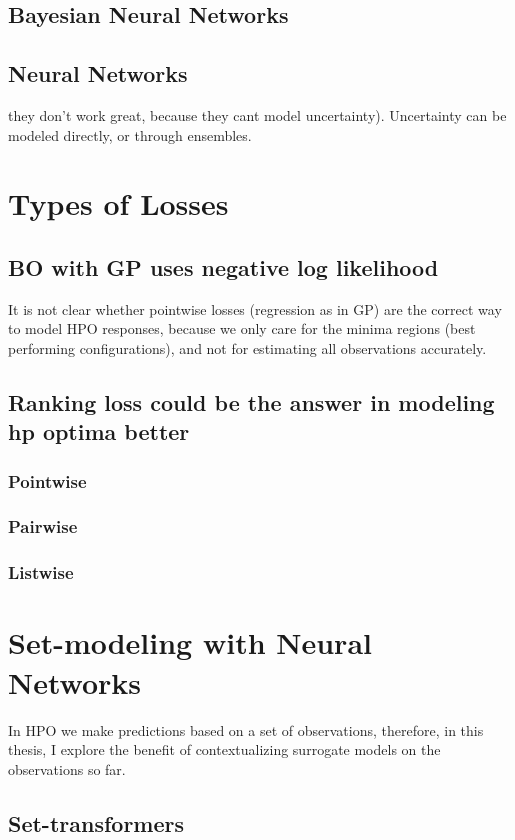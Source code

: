 \documentclass[11pt]{report}
\begin{document}
\subsection{Bayesian Neural Networks}
\subsection{Neural Networks}
they don't work great, because they cant model uncertainty). Uncertainty can be modeled directly, or through ensembles.

\section{Types of Losses}
\subsection{BO with GP uses negative log likelihood}
It is not clear whether pointwise losses (regression as in GP) are the correct way to model HPO responses, because we only care for the minima regions (best performing configurations), and not for estimating all observations accurately.

\subsection{Ranking loss could be the answer in modeling hp optima better}
\subsubsection{Pointwise}
\subsubsection{Pairwise}
\subsubsection{Listwise}

\section{Set-modeling with Neural Networks}
In HPO we make predictions based on a set of observations, therefore, in this thesis, I explore the benefit of contextualizing surrogate models on the observations so far.
\subsection{Set-transformers}
\end{document}
